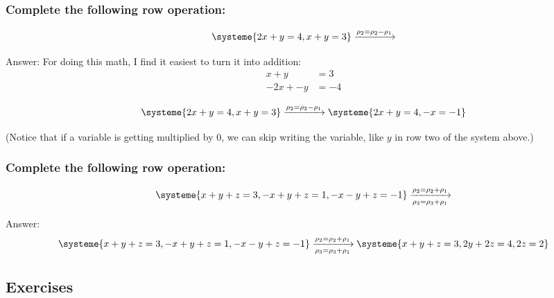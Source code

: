 \documentclass[a4paper,twoside,12pt]{memoir}  %
\begin{document}
\subsubsection{Complete the following row operation:}
\begin{equation*}
  \systeme{
     2x + y = 4,
      x + y = 3
  }
  \xrightarrow{\rho_2 = \rho_2 - \rho_1}
\end{equation*}

Answer:
For doing this math, I find it easiest to turn it into addition:
\begin{align*}
  x  +  y &=  3 \\
  -2x + -y &= -4
\end{align*}

\begin{equation*}
  \systeme{
     2x + y = 4,
      x + y = 3
  }
  \xrightarrow{\rho_2 = \rho_2 - \rho_1}
  \systeme{
     2x + y = 4,
     -x     = -1
  }
\end{equation*}

(Notice that if a variable is getting multiplied by 0, we can skip writing the variable, like $y$ in row two of the system above.)

\subsubsection{Complete the following row operation:}
\begin{equation*}
  \systeme{
    x + y + z = 3,
   -x + y + z = 1,
   -x - y + z = -1
  }
  \xrightarrow[\rho_3 = \rho_3 + \rho_1]{\rho_2 = \rho_2 + \rho_1}
\end{equation*}

Answer:
\begin{equation*}
  \systeme{
    x + y + z = 3,
   -x + y + z = 1,
   -x - y + z = -1
  }
  \xrightarrow[\rho_3 = \rho_3 + \rho_1]{\rho_2 = \rho_2 + \rho_1}
  \systeme{
    x + y + z = 3,
       2y +2z = 4,
           2z = 2
  }
\end{equation*}

\subsection{Exercises}
\end{document}
